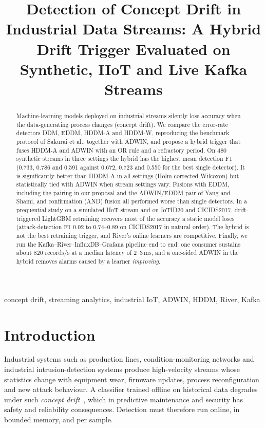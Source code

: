 \documentclass[conference]{IEEEtran}
\begin{document}
\title{Detection of Concept Drift in Industrial Data Streams: A Hybrid Drift Trigger Evaluated on Synthetic, IIoT and Live Kafka Streams}
\author{
}
\maketitle

\begin{abstract}
Machine-learning models deployed on industrial streams silently lose accuracy when the data-generating process changes (concept drift). We compare the error-rate detectors DDM, EDDM, HDDM-A and HDDM-W, reproducing the benchmark protocol of Sakurai et al., together with ADWIN, and propose a hybrid trigger that fuses HDDM-A and ADWIN with an OR rule and a refractory period. On 480 synthetic streams in three settings the hybrid has the highest mean detection F1 (0.733, 0.786 and 0.591 against 0.672, 0.723 and 0.550 for the best single detector). It is significantly better than HDDM-A in all settings (Holm-corrected Wilcoxon) but statistically tied with ADWIN when stream settings vary. Fusions with EDDM, including the pairing in our proposal and the ADWIN/EDDM pair of Yang and Shami, and confirmation (AND) fusion all performed worse than single detectors. In a prequential study on a simulated IIoT stream and on IoTID20 and CICIDS2017, drift-triggered LightGBM retraining recovers most of the accuracy a static model loses (attack-detection F1 0.02 to 0.74--0.89 on CICIDS2017 in natural order). The hybrid is not the best retraining trigger, and River's online learners are competitive. Finally, we run the Kafka--River--InfluxDB--Grafana pipeline end to end: one consumer sustains about 820 records/s at a median latency of 2--3\,ms, and a one-sided ADWIN in the hybrid removes alarms caused by a learner \emph{improving}.
\end{abstract}

\begin{IEEEkeywords}
concept drift, streaming analytics, industrial IoT, ADWIN, HDDM, River, Kafka
\end{IEEEkeywords}

\section{Introduction}
Industrial systems such as production lines, condition-monitoring networks and industrial intrusion-detection systems produce high-velocity streams whose statistics change with equipment wear, firmware updates, process reconfiguration and new attack behaviour. A classifier trained offline on historical data degrades under such \emph{concept drift}~\cite{gama2014survey}, which in predictive maintenance and security has safety and reliability consequences. Detection must therefore run online, in bounded memory, and per sample.
\end{document}
